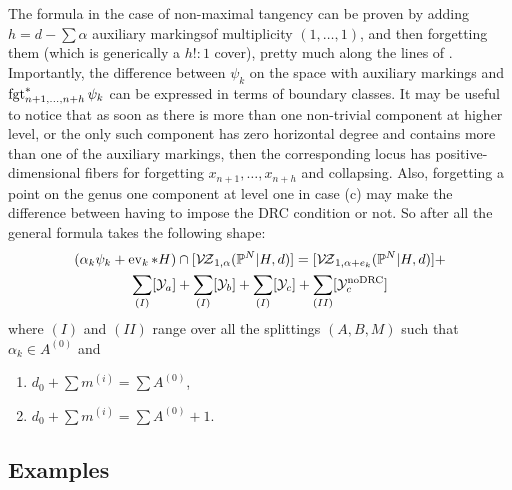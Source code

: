 The formula in the case of non-maximal tangency can be proven by adding $h=d-\sum\alpha$ auxiliary markingsof multiplicity $(1,\ldots,1)$, and then forgetting them (which is generically a $h!\colon 1$ cover), pretty much along the lines of \cite[Corollary 3.5]{Ga}. Importantly, the difference between $\psi_k$ on the space with auxiliary markings and $\operatorname{fgt}_{n+1,\ldots,n+h}^*\psi_k$ can be expressed in terms of boundary classes. It may be useful to notice that as soon as there is more than one non-trivial component at higher level, or the only such component has zero horizontal degree and contains more than one of the auxiliary markings, then the corresponding locus has positive-dimensional fibers for forgetting $x_{n+1},\ldots,x_{n+h}$ and collapsing. Also, forgetting a point on the genus one component at level one in case (c) may make the difference between having to impose the DRC condition or not. So after all the general formula takes the following shape:
\begin{multline*}(\alpha_k\psi_k+\operatorname{ev}_k*H)\cap[\mathcal{V\!Z}_{1,\alpha}(\mathbb P^N|H,d)]=[\mathcal{V\!Z}_{1,\alpha+e_k}(\mathbb P^N|H,d)]+\\ \sum_{(I)}[\mathcal Y_a]+\sum_{(I)}[\mathcal Y_b]+\sum_{(I)}[\mathcal Y_c]+\sum_{(II)}[\mathcal Y_c^{\rm{no DRC}}]\end{multline*}
where $(I)$ and $(II)$ range over all the splittings $(A,B,M)$ such that $\alpha_k\in A^{(0)}$ and
\begin{enumerate}[label=(\Roman*)]
 \item $d_0+\sum m^{(i)}=\sum A^{(0)}$,
 \item $d_0+\sum m^{(i)}=\sum A^{(0)}+1$.
\end{enumerate}

\subsection{Examples}